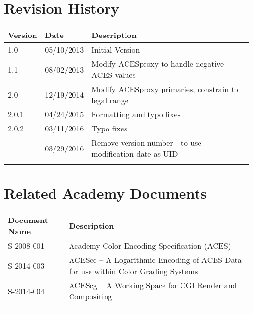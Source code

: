\prelimsectionformat	%
\chapter{Revision History}

\begin{tabularx}{\linewidth}{|l|l|X|}
    \hline
    Version & Date & Description \\ \hline
    1.0     & 05/10/2013 & Initial Version      \\ \hline
    1.1     & 08/02/2013 & Modify ACESproxy to handle negative ACES values \\ \hline
    2.0     & 12/19/2014 & Modify ACESproxy primaries, constrain to legal range \\ \hline
    2.0.1   & 04/24/2015 & Formatting and typo fixes \\ \hline
    2.0.2   & 03/11/2016 & Typo fixes \\ \hline
            & 03/29/2016 & Remove version number - to use modification date as UID \\ \hline
            &      &             \\ \hline
\end{tabularx}

\vspace{0.25in} %
\chapter{Related Academy Documents} %
\begin{tabularx}{\linewidth}{|l|X|}
    \hline
    Document Name & Description \\ \hline
    S-2008-001  & Academy Color Encoding Specification (ACES) \\ \hline
    S-2014-003  & ACEScc -- A Logarithmic Encoding of ACES Data for use within Color Grading Systems \\ \hline
    S-2014-004  & ACEScg -- A Working Space for CGI Render and Compositing \\ \hline
    & \\ \hline
    & \\ \hline
\end{tabularx}